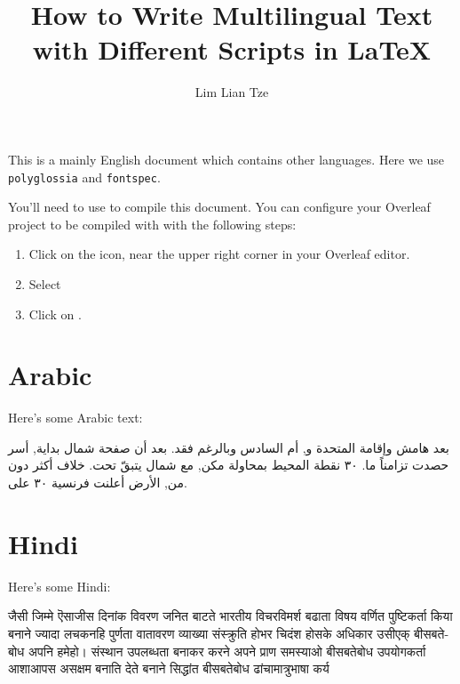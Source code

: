 \documentclass[12pt]{scrartcl}
\title{How to Write Multilingual Text with Different Scripts in \LaTeX}
\author{Lim Lian Tze}
\begin{document}
\maketitle

This is a mainly English document which contains other languages. Here we use \texttt{polyglossia} and \texttt{fontspec}. 

You'll need to use  to compile this document. You can configure your Overleaf project to be compiled with  with the following steps:

\begin{enumerate}
\item Click on the \keys{\faCog} icon, near the upper right corner in your Overleaf editor.
\item Select 
\item Click on .
\end{enumerate}



\section{Arabic}
Here's some Arabic text:

\begin{Arabic}
بعد هامش وإقامة المتحدة و, أم السادس وبالرغم فقد. بعد أن صفحة شمال بداية, أسر حصدت تزامناً ما. ٣٠ نقطة المحيط بمحاولة مكن, مع شمال يتبقّ تحت. خلاف أكثر دون من, الأرض أعلنت فرنسية ٣٠ على.
\end{Arabic}



\section{Hindi}

Here's some Hindi:

\begin{hindi}
जैसी जिम्मे ऎसाजीस दिनांक विवरण जनित बाटते भारतीय विचरविमर्श बढाता विषय वर्णित पुष्टिकर्ता किया बनाने ज्यादा लचकनहि पुर्णता वातावरण व्याख्या संस्क्रुति होभर चिदंश होसके अधिकार उसीएक् बीसबतेबोध अपनि हमेहो। संस्थान उपलब्धता बनाकर करने अपने प्राण समस्याओ बीसबतेबोध उपयोगकर्ता आशाआपस असक्षम बनाति देते बनाने सिद्धांत बीसबतेबोध ढांचामात्रुभाषा कर्य
\end{hindi}
\end{document}
